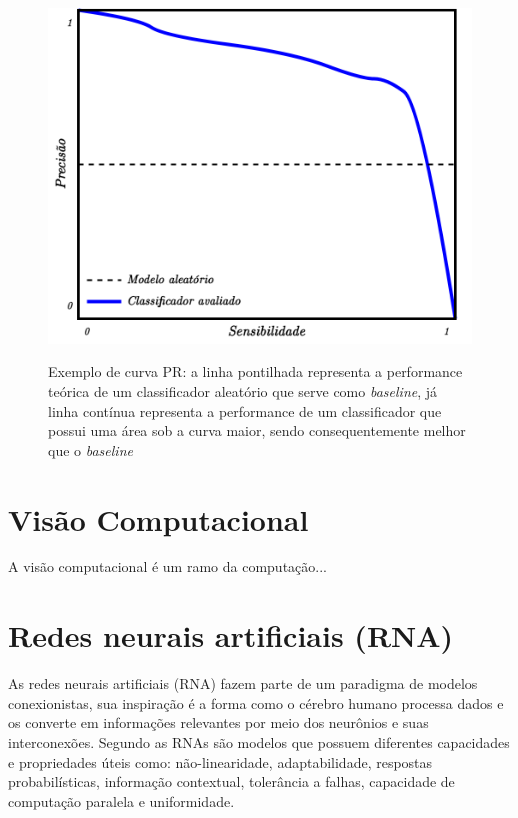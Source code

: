 \begin{figure}[htbp]
	\centering
	\caption{Exemplo de curva PR: a linha pontilhada representa a performance teórica de um classificador aleatório que serve como \textit{baseline}, já linha contínua representa a performance de um classificador que possui uma área sob a curva maior, sendo consequentemente melhor que o \textit{baseline}}
		\includegraphics[scale=.25]{imagens/prcurve.png}
	\label{fig:prcurve}
\end{figure}

\section{Visão Computacional}

A visão computacional é um ramo da computação...

\section{Redes neurais artificiais (RNA)}

As redes neurais artificiais (RNA) fazem parte de um paradigma de modelos conexionistas, sua inspiração é a forma como o cérebro humano processa dados e os converte em informações relevantes por meio dos neurônios e suas interconexões. Segundo  as RNAs são modelos que possuem diferentes capacidades e propriedades úteis como: não-linearidade, adaptabilidade, respostas probabilísticas, informação contextual, tolerância a falhas, capacidade de computação paralela e uniformidade.

